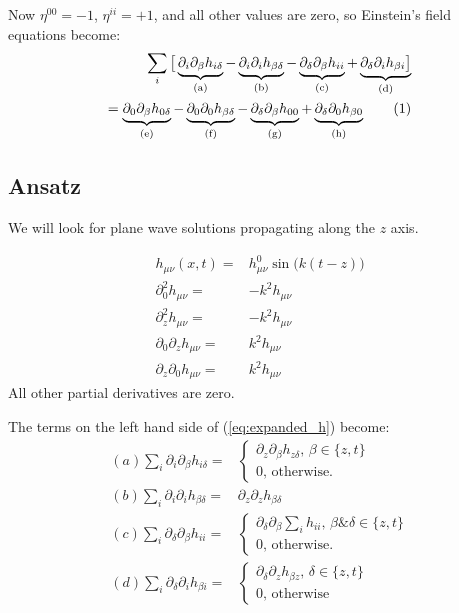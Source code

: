 \documentclass[]{article}
\newcommand\numberthis{\addtocounter{equation}{1}\tag{\theequation}}
\begin{document}
Now $\eta^{00}=-1$, $\eta^{ii}=+1$, and all other values are zero, so Einstein's field equations become:
\begin{align*}
	\sum_i\big[\underbrace{\partial_i\partial_\beta h_{i\delta}}_\text{(a)} - \underbrace{\partial_i\partial_i h_{\beta\delta}}_\text{(b)} -  \underbrace{\partial_\delta\partial_\beta h_{ii}}_\text{(c)} + \underbrace{\partial_\delta\partial_i h_{\beta i}\big]}_\text{(d)}\\
	=\underbrace{\partial_0\partial_\beta h_{0\delta}}_\text{(e)} - \underbrace{\partial_0\partial_0 h_{\beta\delta}}_\text{(f)} -  \underbrace{\partial_\delta\partial_\beta h_{00}}_\text{(g)} + \underbrace{\partial_\delta\partial_0 h_{\beta 0}}_\text{(h)} \numberthis \label{eq:expanded_h}
\end{align*}

\subsection{Ansatz}

We will look for plane wave solutions propagating along the $z$ axis.

\begin{align*}
	h_{\mu\nu}(x,t)=&h^0_{\mu\nu} \sin\big(k(t-z)\big)\\
	\partial_0^2 h_{\mu\nu}=& -k^2 h_{\mu\nu}\\
	\partial_z^2 h_{\mu\nu}=& -k^2 h_{\mu\nu}\\
	\partial_0 \partial_z  h_{\mu\nu}=& k^2 h_{\mu\nu}\\
	\partial_z \partial_0  h_{\mu\nu}=& k^2 h_{\mu\nu}
\end{align*}
All other partial derivatives are zero.

The terms on the left hand side of (\ref{eq:expanded_h}) become:
\begin{align*}
	(a)	\sum_i \partial_i\partial_\beta h_{i\delta} =& \begin{cases}
			\partial_z\partial_\beta h_{z\delta} \text{, $\beta\in \{z,t\}$}\\
			0 \text{, otherwise.}
		\end{cases}\\
	(b)	\sum_i \partial_i\partial_i h_{\beta\delta} =& \partial_z\partial_z h_{\beta\delta}\\
	(c)	\sum_i \partial_\delta \partial_\beta h_{ii} =&\begin{cases}
	\partial_\delta \partial_\beta \sum_i h_{ii} \text{, $\beta\&\delta\in\{z,t\}$}\\
	0 \text{, otherwise}.
	\end{cases}\\
	(d)	\sum_i \partial_\delta\partial_i h_{\beta i} =& \begin{cases}
	\partial_\delta\partial_z h_{\beta z} \text {, $\delta\in\{z,t\}$}\\
	0 \text{, otherwise }
	\end{cases}
\end{align*}
\end{document}
